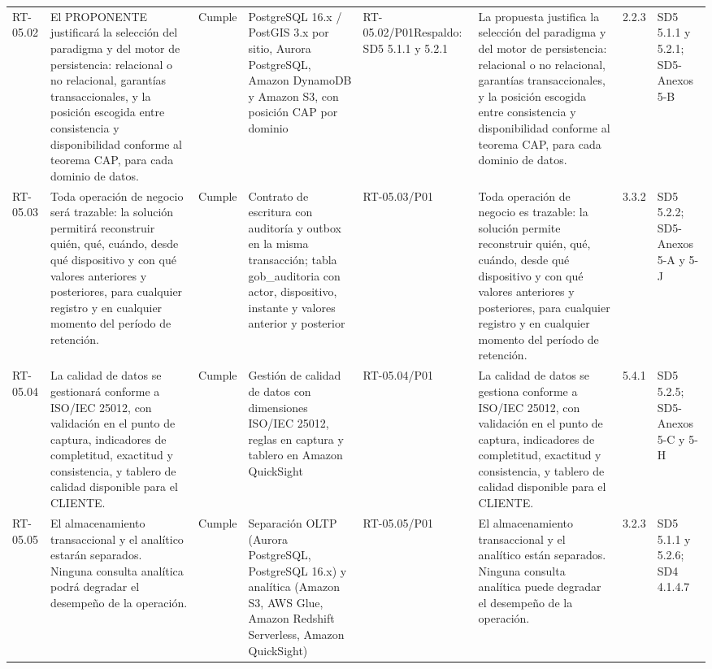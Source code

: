 \documentclass[oficio,firma,final]{lafrox}
\begin{document}
\begin{landscape}
{\begin{longtable}{@{}F{0.054} F{0.173} F{0.061} F{0.191} F{0.106} F{0.180} F{0.067} F{0.168}@{}}
  RT-05.02 & El PROPONENTE justificará la selección del paradigma y del motor de persistencia: relacional o no relacional, garantías transaccionales, y la posición escogida entre consistencia y disponibilidad conforme al teorema CAP, para cada dominio de datos. & Cumple & PostgreSQL 16.x / PostGIS 3.x por sitio, Aurora PostgreSQL, Amazon DynamoDB y Amazon S3, con posición CAP por dominio & RT-05.02/\allowbreak{}P01\newline Respaldo: SD5 5.1.1 y 5.2.1 & La propuesta justifica la selección del paradigma y del motor de persistencia: relacional o no relacional, garantías transaccionales, y la posición escogida entre consistencia y disponibilidad conforme al teorema CAP, para cada dominio de datos. & 2.2.3 & SD5 5.1.1 y 5.2.1; SD5-Anexos 5-B  \\
  RT-05.03 & Toda operación de negocio será trazable: la solución permitirá reconstruir quién, qué, cuándo, desde qué dispositivo y con qué valores anteriores y posteriores, para cualquier registro y en cualquier momento del período de retención. & Cumple & Contrato de escritura con auditoría y outbox en la misma transacción; tabla gob\_auditoria con actor, dispositivo, instante y valores anterior y posterior & RT-05.03/\allowbreak{}P01 & Toda operación de negocio es trazable: la solución permite reconstruir quién, qué, cuándo, desde qué dispositivo y con qué valores anteriores y posteriores, para cualquier registro y en cualquier momento del período de retención. & 3.3.2 & SD5 5.2.2; SD5-Anexos 5-A y 5-J  \\
  RT-05.04 & La calidad de datos se gestionará conforme a ISO/IEC 25012, con validación en el punto de captura, indicadores de completitud, exactitud y consistencia, y tablero de calidad disponible para el CLIENTE. & Cumple & Gestión de calidad de datos con dimensiones ISO/IEC 25012, reglas en captura y tablero en Amazon QuickSight & RT-05.04/\allowbreak{}P01 & La calidad de datos se gestiona conforme a ISO/IEC 25012, con validación en el punto de captura, indicadores de completitud, exactitud y consistencia, y tablero de calidad disponible para el CLIENTE. & 5.4.1 & SD5 5.2.5; SD5-Anexos 5-C y 5-H  \\
  RT-05.05 & El almacenamiento transaccional y el analítico estarán separados. Ninguna consulta analítica podrá degradar el desempeño de la operación. & Cumple & Separación OLTP (Aurora PostgreSQL, PostgreSQL 16.x) y analítica (Amazon S3, AWS Glue, Amazon Redshift Serverless, Amazon QuickSight) & RT-05.05/\allowbreak{}P01 & El almacenamiento transaccional y el analítico están separados. Ninguna consulta analítica puede degradar el desempeño de la operación. & 3.2.3 & SD5 5.1.1 y 5.2.6; SD4 4.1.4.7  \\

\end{longtable}}
\end{landscape}
\end{document}
